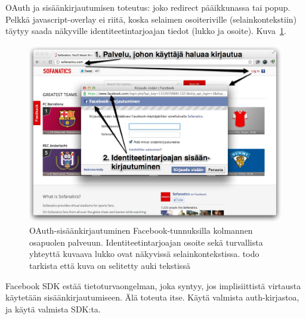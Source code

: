 \documentclass[finnish,gradu]{tktltiki}
\begin{document}
  OAuth ja sisäänkirjautumisen toteutus: joko redirect pääikkunassa tai popup. Pelkkä javascript-overlay ei riitä, koska selaimen osoiteriville (selainkontekstiin) täytyy saada näkyville identiteetintarjoajan tiedot (lukko ja osoite). Kuva~\ref{fig:facebook_oauth_login}.
  \begin{figure}
    \centering
    \includegraphics[width=1.0\textwidth]{images/facebook_popup_login.jpg}
    \caption{OAuth-sisäänkirjautuminen Facebook-tunnuksilla kolmannen osapuolen palveuun. Identiteetintarjoajan osoite sekä turvallista yhteyttä kuvaava lukko ovat näkyvissä selainkontekstissa. todo tarkista että kuva on selitetty auki tekstissä}
    \label{fig:facebook_oauth_login}
  \end{figure}

  Facebook SDK estää tietoturvaongelman, joka syntyy, jos implisiittistä virtausta käytetään sisäänkirjautumiseen. Älä toteuta itse. Käytä valmista auth-kirjastoa, ja käytä valmista SDK:ta.
\end{document}
